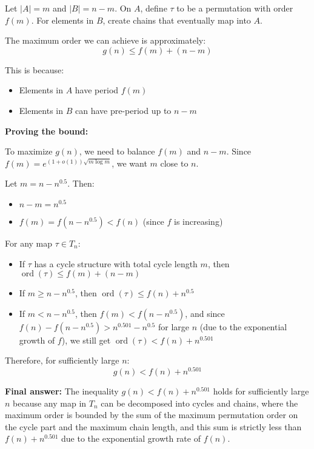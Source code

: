 \documentclass[12pt,a4paper]{article}
\theoremstyle{definition}
\begin{document}
    Let $|A| = m$ and $|B| = n - m$. On $A$, define $\tau$ to be a permutation with order $f(m)$. For elements in $B$, create chains that eventually map into $A$.

    The maximum order we can achieve is approximately:
    $$g(n) \leq f(m) + (n - m)$$

    This is because:
    \begin{itemize}
        \item Elements in $A$ have period $f(m)$
        \item Elements in $B$ can have pre-period up to $n - m$
    \end{itemize}

    \textbf{Proving the bound:}

    To maximize $g(n)$, we need to balance $f(m)$ and $n - m$. Since $f(m) = e^{(1+o(1))\sqrt{m \log m}}$, we want $m$ close to $n$.

    Let $m = n - n^{0.5}$. Then:
    \begin{itemize}
        \item $n - m = n^{0.5}$
        \item $f(m) = f(n - n^{0.5}) < f(n)$ (since $f$ is increasing)
    \end{itemize}

    For any map $\tau \in T_n$:
    \begin{itemize}
        \item If $\tau$ has a cycle structure with total cycle length $m$, then $\operatorname{ord}(\tau) \leq f(m) + (n-m)$
        \item If $m \geq n - n^{0.5}$, then $\operatorname{ord}(\tau) \leq f(n) + n^{0.5}$
        \item If $m < n - n^{0.5}$, then $f(m) < f(n - n^{0.5})$, and since $f(n) - f(n - n^{0.5}) > n^{0.501} - n^{0.5}$ for large $n$ (due to the exponential growth of $f$), we still get $\operatorname{ord}(\tau) < f(n) + n^{0.501}$
    \end{itemize}

    Therefore, for sufficiently large $n$:
    $$g(n) < f(n) + n^{0.501}$$

    \textbf{Final answer:} The inequality $g(n) < f(n) + n^{0.501}$ holds for sufficiently large $n$ because any map in $T_n$ can be decomposed into cycles and chains, where the maximum order is bounded by the sum of the maximum permutation order on the cycle part and the maximum chain length, and this sum is strictly less than $f(n) + n^{0.501}$ due to the exponential growth rate of $f(n)$.
\end{document}
